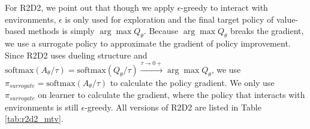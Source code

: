 For R2D2, we point out that though we apply $\epsilon$-greedy to interact with environments, $\epsilon$ is only used for exploration and the final target policy of value-based methods is simply $\arg\max Q_\theta$. 
Because $\arg\max Q_\theta$ breaks the gradient, we use a surrogate policy to approximate the gradient of policy improvement. 
Since R2D2 uses dueling structure and $\text{softmax}(A_\theta / \tau) = \text{softmax}(Q_\theta / \tau) \overset{\tau \rightarrow 0+}{\longrightarrow} \arg\max Q_\theta$, we use $\pi_{surrogate} = \text{softmax}(A_\theta / \tau)$ to calculate the policy gradient. 
We only use $\pi_{surrogate}$ on learner to calculate the gradient, where the policy that interacts with environments is still $\epsilon$-greedy. 
All versions of R2D2 are listed in Table \ref{tab:r2d2_mtv}.










